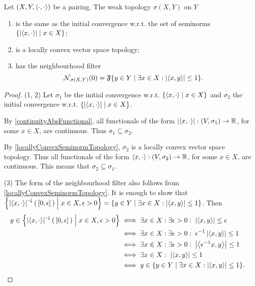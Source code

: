 \begin{lemma} \label{weakTopologyLCTVS}
Let $\left( X,Y,\left\langle \cdot,\cdot \right\rangle \right)$ be a pairing. The weak topology $\sigma(X,Y)$ on $Y$ 
\begin{enumerate}
\item is the same as the initial convergence w.r.t. the set of seminorms $\setbuilder{\abspair{x,\cdot}}{x\in X}$;
\item is a locally convex vector space topology;
\item has the neighbourhood filter
\[ \neighbourhood_{\sigma(X,Y)}(0) = \mathfrak{F}\setbuilder{y\in Y}{\exists x\in X: \abspair{x,y} \leq 1}. \]
\end{enumerate}
\end{lemma}
\begin{proof}
(1, 2) Let $\sigma_1$ be the initial convergence w.r.t. $\setbuilder{\pair{x,\cdot}}{x\in X}$ and $\sigma_2$ the initial convergence w.r.t. $\setbuilder{\abspair{x,\cdot}}{x\in X}$.

By \ref{continuityAbsFunctional}, all functionals of the form $\left|\left\langle x,\cdot \right\rangle\right|: \left( V,\sigma_1 \right) \to \mathbb{R}$, for some $x\in X$, are continuous. Thus $\sigma_1 \subseteq \sigma_2$.

By \ref{locallyConvexSeminormTopology}, $\sigma_2$ is a locally convex vector space topology. Thus all functionals of the form $\left\langle x,\cdot \right\rangle: \left( V,\sigma_2 \right) \to \mathbb{R}$, for some $x\in X$, are continuous. This means that $\sigma_2 \subseteq \sigma_1$.

(3) The form of the neighbourhood filter also follows from \ref{locallyConvexSeminormTopology}. It is enough to show that $\setbuilder{\abspair{x,\cdot}^{\preimf}(\,[0,\epsilon]\,)}{x\in X, \epsilon > 0} = \setbuilder{y\in Y}{\exists x\in X: \abspair{x,y} \leq 1}$. Then
\begin{align*}
y \in \setbuilder{\abspair{x,\cdot}^{\preimf}(\,[0,\epsilon]\,)}{x\in X, \epsilon > 0} &\iff \exists x\in X: \exists \epsilon > 0: \; \abspair{x,y} \leq \epsilon \\
&\iff \exists x\in X: \exists \epsilon > 0: \; \epsilon^{-1}\abspair{x,y} \leq 1 \\
&\iff \exists x\in X: \exists \epsilon > 0: \; \abspair{\epsilon^{-1}x,y} \leq 1 \\
&\iff \exists x\in X: \; \abspair{x,y} \leq 1 \\
&\iff y\in \setbuilder{y\in Y}{\exists x\in X: \abspair{x,y} \leq 1}.
\end{align*}
\end{proof}


